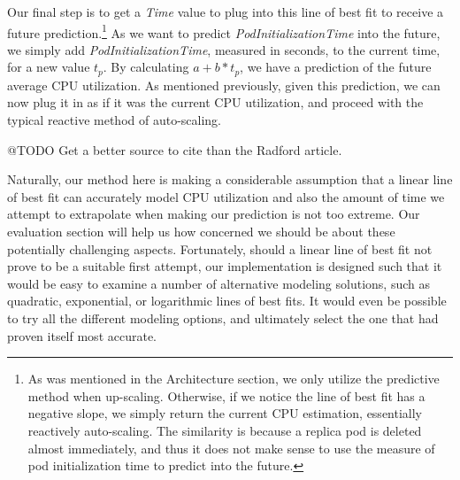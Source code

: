 Our final step is to get a \textit{Time} value to plug into this line of best
fit to receive a future prediction.\footnote{As was mentioned in the
Architecture section, we only utilize the predictive method when up-scaling.
Otherwise, if we notice the line of best fit has a negative slope, we simply
return the current CPU estimation, essentially reactively auto-scaling. The
similarity is because a replica pod is deleted almost immediately, and thus it
does not make sense to use the measure of pod initialization time to predict
into the future.} As we want to predict
\textit{PodInitializationTime} into the future, we simply add
\textit{PodInitializationTime}, measured in seconds, to the current time, for a
new value $t_{p}$. By calculating $a + b * t_{p}$, we have a prediction of the
future average CPU utilization. As mentioned previously, given this prediction,
we can now plug it in as if it was the current CPU utilization, and proceed with
the typical reactive method of auto-scaling.

@TODO Get a better source to cite than the Radford article.

Naturally, our method here is making a considerable assumption that a linear
line of best fit can accurately model CPU utilization and also the amount of
time we attempt to extrapolate when making our prediction is not too extreme.
Our evaluation section will help us how concerned we should be about these
potentially challenging aspects. Fortunately, should a linear line of best fit
not prove to be a suitable first attempt, our implementation is designed such
that it would be easy to examine a number of alternative modeling solutions,
such as quadratic, exponential, or logarithmic lines of best fits. It would even
be possible to try all the different modeling options, and ultimately select
the one that had proven itself most accurate.
